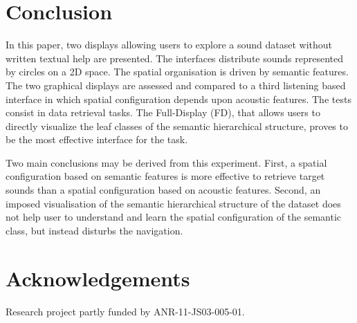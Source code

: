 \documentclass{aes2e}
\begin{document}
\section{Conclusion}

In this paper, two displays allowing users to explore a sound dataset without written textual help are presented. The interfaces distribute sounds represented by circles on a 2D space. The spatial organisation is driven by semantic features. The two graphical displays are assessed and compared to a third listening based interface in which spatial configuration depends upon acoustic features. The tests consist in data retrieval tasks. 
The Full-Display (FD), that allows users to directly visualize the leaf classes of the semantic hierarchical structure, proves to be the most effective interface for the task.

Two main conclusions may be derived from this experiment. First, a spatial configuration based on semantic features is more effective to retrieve target sounds than a spatial configuration based on acoustic features. Second, an imposed visualisation of the semantic hierarchical structure of the dataset does not help user to understand and learn the spatial configuration of the semantic class, but instead disturbs the navigation. 


%


\section{Acknowledgements}

Research project partly funded by ANR-11-JS03-005-01.



%
%
\end{document}
